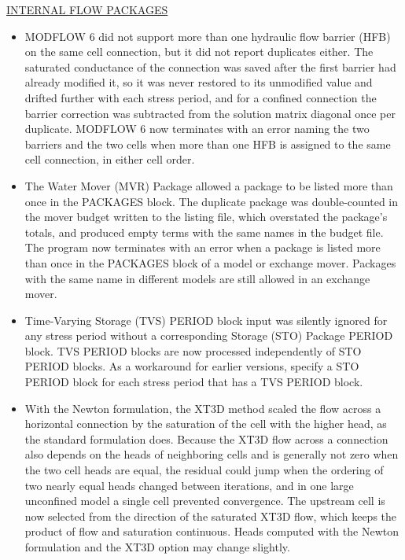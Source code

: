 \underline{INTERNAL FLOW PACKAGES}
\begin{itemize}
\item MODFLOW 6 did not support more than one hydraulic flow barrier (HFB) on the same cell connection, but it did not report duplicates either. The saturated conductance of the connection was saved after the first barrier had already modified it, so it was never restored to its unmodified value and drifted further with each stress period, and for a confined connection the barrier correction was subtracted from the solution matrix diagonal once per duplicate. MODFLOW 6 now terminates with an error naming the two barriers and the two cells when more than one HFB is assigned to the same cell connection, in either cell order.
\item The Water Mover (MVR) Package allowed a package to be listed more than once in the PACKAGES block. The duplicate package was double-counted in the mover budget written to the listing file, which overstated the package's totals, and produced empty terms with the same names in the budget file. The program now terminates with an error when a package is listed more than once in the PACKAGES block of a model or exchange mover. Packages with the same name in different models are still allowed in an exchange mover.
\item Time-Varying Storage (TVS) PERIOD block input was silently ignored for any stress period without a corresponding Storage (STO) Package PERIOD block. TVS PERIOD blocks are now processed independently of STO PERIOD blocks. As a workaround for earlier versions, specify a STO PERIOD block for each stress period that has a TVS PERIOD block.
\item With the Newton formulation, the XT3D method scaled the flow across a horizontal connection by the saturation of the cell with the higher head, as the standard formulation does. Because the XT3D flow across a connection also depends on the heads of neighboring cells and is generally not zero when the two cell heads are equal, the residual could jump when the ordering of two nearly equal heads changed between iterations, and in one large unconfined model a single cell prevented convergence. The upstream cell is now selected from the direction of the saturated XT3D flow, which keeps the product of flow and saturation continuous. Heads computed with the Newton formulation and the XT3D option may change slightly.
\end{itemize}

